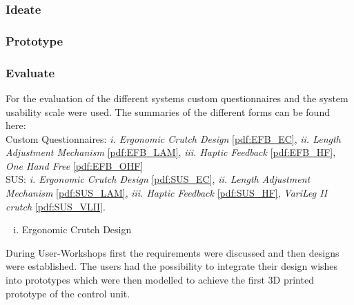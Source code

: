 \subsubsection{Ideate}
\label{subsec:ideate}

\subsubsection{Prototype}
\label{subsec:prototype}

\subsubsection{Evaluate}
\label{subsec:evaluate}
For the evaluation of the different systems custom questionnaires and the system usability scale were used. The summaries of the different forms can be found here:\\
Custom Questionnaires: \textit{i. Ergonomic Crutch Design} \ref{pdf:EFB_EC}, \textit{ii. Length Adjustment Mechanism} \ref{pdf:EFB_LAM}, \textit{iii. Haptic Feedback} \ref{pdf:EFB_HF}, \textit{One Hand Free} \ref{pdf:EFB_OHF}\\
SUS: \textit{i. Ergonomic Crutch Design} \ref{pdf:SUS_EC}, \textit{ii. Length Adjustment Mechanism} \ref{pdf:SUS_LAM}, \textit{iii. Haptic Feedback} \ref{pdf:SUS_HF}, \textit{VariLeg II crutch} \ref{pdf:SUS_VLII}.
\cleardoublepage

\label{pdf:EFB_EC}
\cleardoublepage

\label{pdf:EFB_LAM}
\cleardoublepage

\label{pdf:EFB_HF}
\cleardoublepage

\label{pdf:EFB_OHF}
\cleardoublepage

\label{pdf:SUS_EC}
\cleardoublepage

\label{pdf:SUS_LAM}
\cleardoublepage

\label{pdf:SUS_HF}
\cleardoublepage

\label{pdf:SUS_VLII}



\begin{enumerate}[i.]
\item{Ergonomic Crutch Design}
\end{enumerate}

During User-Workshops first the requirements were discussed and then designs were established. The users had the possibility to integrate their design wishes into prototypes which were then modelled to achieve the first 3D printed prototype of the control unit.

